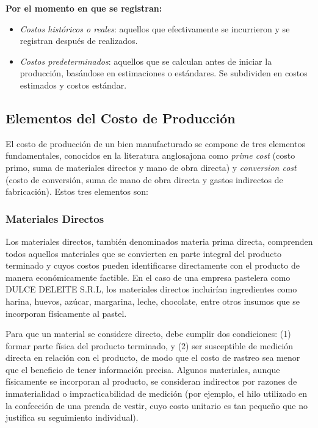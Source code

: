 \documentclass[
  stu,
  floatsintext,
  longtable,
  a4paper,
  nolmodern,
  notxfonts,
  notimes,
  12pt,
  colorlinks=true,linkcolor=blue,citecolor=blue,urlcolor=blue]{apa7}
\begin{document}
\textbf{Por el momento en que se registran:}

\begin{itemize}
\item
  \emph{Costos históricos o reales}: aquellos que efectivamente se
  incurrieron y se registran después de realizados.
\item
  \emph{Costos predeterminados}: aquellos que se calculan antes de
  iniciar la producción, basándose en estimaciones o estándares. Se
  subdividen en costos estimados y costos estándar.
\end{itemize}

\subsection{Elementos del Costo de
Producción}\label{elementos-del-costo-de-producciuxf3n}

El costo de producción de un bien manufacturado se compone de tres
elementos fundamentales, conocidos en la literatura anglosajona como
\emph{prime cost} (costo primo, suma de materiales directos y mano de
obra directa) y \emph{conversion cost} (costo de conversión, suma de
mano de obra directa y gastos indirectos de fabricación). Estos tres
elementos son:

\subsubsection{Materiales Directos}\label{materiales-directos}

Los materiales directos, también denominados materia prima directa,
comprenden todos aquellos materiales que se convierten en parte integral
del producto terminado y cuyos costos pueden identificarse directamente
con el producto de manera económicamente factible. En el caso de una
empresa pastelera como DULCE DELEITE S.R.L, los materiales directos
incluirían ingredientes como harina, huevos, azúcar, margarina, leche,
chocolate, entre otros insumos que se incorporan físicamente al pastel.

Para que un material se considere directo, debe cumplir dos condiciones:
(1) formar parte física del producto terminado, y (2) ser susceptible de
medición directa en relación con el producto, de modo que el costo de
rastreo sea menor que el beneficio de tener información precisa. Algunos
materiales, aunque físicamente se incorporan al producto, se consideran
indirectos por razones de inmaterialidad o impracticabilidad de medición
(por ejemplo, el hilo utilizado en la confección de una prenda de
vestir, cuyo costo unitario es tan pequeño que no justifica su
seguimiento individual).
\end{document}
